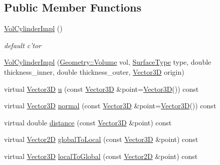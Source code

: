 \subsection*{Public Member Functions}
\begin{DoxyCompactItemize}
\item 
\hyperlink{class_d_d4hep_1_1_d_d_rec_1_1_vol_cylinder_impl_a9a2fc6a4cef827e0636f7591add7f73b}{VolCylinderImpl} ()
\begin{DoxyCompactList}\small\item\em default c'tor \item\end{DoxyCompactList}\item 
\hyperlink{class_d_d4hep_1_1_d_d_rec_1_1_vol_cylinder_impl_ac5d085d722bab6fe924dcd0bc58d0874}{VolCylinderImpl} (\hyperlink{class_d_d4hep_1_1_geometry_1_1_volume}{Geometry::Volume} vol, \hyperlink{class_d_d_surfaces_1_1_surface_type}{SurfaceType} type, double thickness\_\-inner, double thickness\_\-outer, \hyperlink{class_d_d_surfaces_1_1_vector3_d}{Vector3D} origin)
\item 
virtual \hyperlink{class_d_d_surfaces_1_1_vector3_d}{Vector3D} \hyperlink{class_d_d4hep_1_1_d_d_rec_1_1_vol_cylinder_impl_a7c2990e721f48f65bd4fda4cfd00c976}{u} (const \hyperlink{class_d_d_surfaces_1_1_vector3_d}{Vector3D} \&point=\hyperlink{class_d_d_surfaces_1_1_vector3_d}{Vector3D}()) const 
\item 
virtual \hyperlink{class_d_d_surfaces_1_1_vector3_d}{Vector3D} \hyperlink{class_d_d4hep_1_1_d_d_rec_1_1_vol_cylinder_impl_a1863142729883b2e20c78dadabd04927}{normal} (const \hyperlink{class_d_d_surfaces_1_1_vector3_d}{Vector3D} \&point=\hyperlink{class_d_d_surfaces_1_1_vector3_d}{Vector3D}()) const 
\item 
virtual double \hyperlink{class_d_d4hep_1_1_d_d_rec_1_1_vol_cylinder_impl_adb7ecbd032387e6e2a2903251e66e490}{distance} (const \hyperlink{class_d_d_surfaces_1_1_vector3_d}{Vector3D} \&point) const 
\item 
virtual \hyperlink{class_d_d_surfaces_1_1_vector2_d}{Vector2D} \hyperlink{class_d_d4hep_1_1_d_d_rec_1_1_vol_cylinder_impl_a66cd91cef2963fa1d1495d4764e2d94f}{globalToLocal} (const \hyperlink{class_d_d_surfaces_1_1_vector3_d}{Vector3D} \&point) const 
\item 
virtual \hyperlink{class_d_d_surfaces_1_1_vector3_d}{Vector3D} \hyperlink{class_d_d4hep_1_1_d_d_rec_1_1_vol_cylinder_impl_ae0918a43a874b96dc2f55506d4f509a2}{localToGlobal} (const \hyperlink{class_d_d_surfaces_1_1_vector2_d}{Vector2D} \&point) const 
\end{DoxyCompactItemize}



